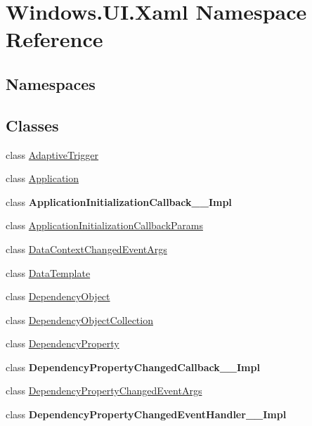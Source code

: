 \hypertarget{namespace_windows_1_1_u_i_1_1_xaml}{}\section{Windows.\+U\+I.\+Xaml Namespace Reference}
\label{namespace_windows_1_1_u_i_1_1_xaml}
\subsection*{Namespaces}
\begin{DoxyCompactItemize}
\end{DoxyCompactItemize}
\subsection*{Classes}
\begin{DoxyCompactItemize}
\item 
class \hyperlink{class_windows_1_1_u_i_1_1_xaml_1_1_adaptive_trigger}{Adaptive\+Trigger}
\item 
class \hyperlink{class_windows_1_1_u_i_1_1_xaml_1_1_application}{Application}
\item 
class {\bfseries Application\+Initialization\+Callback\+\_\+\+\_\+\+Impl}
\item 
class \hyperlink{class_windows_1_1_u_i_1_1_xaml_1_1_application_initialization_callback_params}{Application\+Initialization\+Callback\+Params}
\item 
class \hyperlink{class_windows_1_1_u_i_1_1_xaml_1_1_data_context_changed_event_args}{Data\+Context\+Changed\+Event\+Args}
\item 
class \hyperlink{class_windows_1_1_u_i_1_1_xaml_1_1_data_template}{Data\+Template}
\item 
class \hyperlink{class_windows_1_1_u_i_1_1_xaml_1_1_dependency_object}{Dependency\+Object}
\item 
class \hyperlink{class_windows_1_1_u_i_1_1_xaml_1_1_dependency_object_collection}{Dependency\+Object\+Collection}
\item 
class \hyperlink{class_windows_1_1_u_i_1_1_xaml_1_1_dependency_property}{Dependency\+Property}
\item 
class {\bfseries Dependency\+Property\+Changed\+Callback\+\_\+\+\_\+\+Impl}
\item 
class \hyperlink{class_windows_1_1_u_i_1_1_xaml_1_1_dependency_property_changed_event_args}{Dependency\+Property\+Changed\+Event\+Args}
\item 
class {\bfseries Dependency\+Property\+Changed\+Event\+Handler\+\_\+\+\_\+\+Impl}

\end{DoxyCompactItemize}
